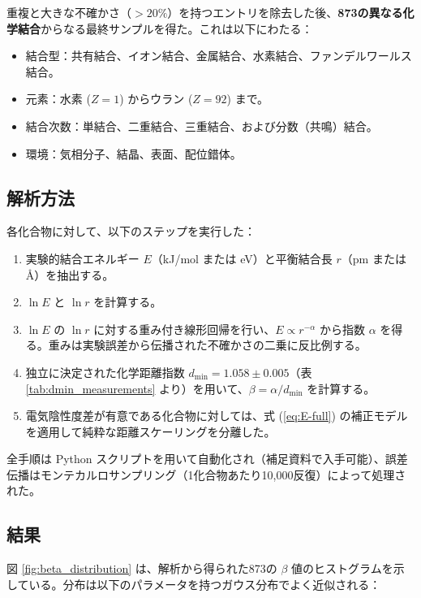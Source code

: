 \documentclass[11pt,a4paper]{article}
\begin{document}
	重複と大きな不確かさ（\(>20\%\)）を持つエントリを除去した後、\textbf{873の異なる化学結合}からなる最終サンプルを得た。これは以下にわたる：
	\begin{itemize}
		\item 結合型：共有結合、イオン結合、金属結合、水素結合、ファンデルワールス結合。
		\item 元素：水素 (\(Z=1\)) からウラン (\(Z=92\)) まで。
		\item 結合次数：単結合、二重結合、三重結合、および分数（共鳴）結合。
		\item 環境：気相分子、結晶、表面、配位錯体。
	\end{itemize}
	
	\subsection{解析方法}
	
	各化合物に対して、以下のステップを実行した：
	
	\begin{enumerate}
		\item 実験的結合エネルギー \(E\)（kJ/mol または eV）と平衡結合長 \(r\)（pm または Å）を抽出する。
		\item \(\ln E\) と \(\ln r\) を計算する。
		\item \(\ln E\) の \(\ln r\) に対する重み付き線形回帰を行い、\(E \propto r^{-\alpha}\) から指数 \(\alpha\) を得る。重みは実験誤差から伝播された不確かさの二乗に反比例する。
		\item 独立に決定された化学距離指数 \(d_{\text{min}} = 1.058 \pm 0.005\)（表 \ref{tab:dmin_measurements} より）を用いて、\(\beta = \alpha / d_{\text{min}}\) を計算する。
		\item 電気陰性度差が有意である化合物に対しては、式 (\ref{eq:E-full}) の補正モデルを適用して純粋な距離スケーリングを分離した。
	\end{enumerate}
	
	全手順は Python スクリプトを用いて自動化され（補足資料で入手可能）、誤差伝播はモンテカルロサンプリング（1化合物あたり10,000反復）によって処理された。
	
	\subsection{結果}
	
	図 \ref{fig:beta_distribution} は、解析から得られた873の \(\beta\) 値のヒストグラムを示している。分布は以下のパラメータを持つガウス分布でよく近似される：
	
\end{document}
